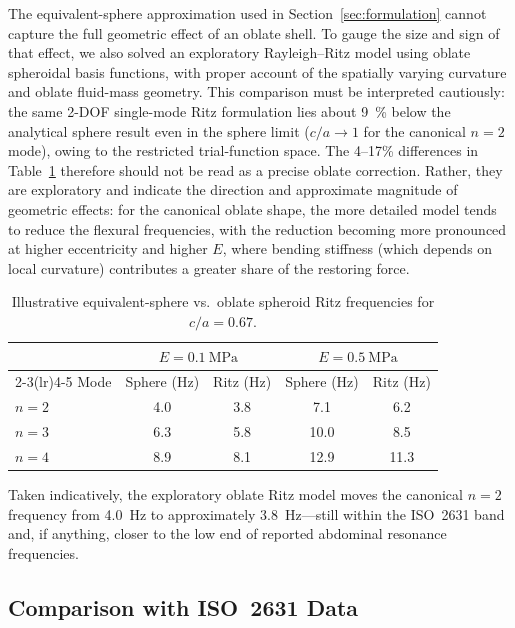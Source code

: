The equivalent-sphere approximation used in Section~\ref{sec:formulation}
cannot capture the full geometric effect of an oblate shell.  To gauge the
size and sign of that effect, we also solved an exploratory Rayleigh--Ritz
model using oblate spheroidal basis functions, with proper account of the
spatially varying curvature and oblate fluid-mass geometry.  This comparison
must be interpreted cautiously: the same 2-DOF single-mode Ritz formulation
lies about \SI{9}{\percent} below the analytical sphere result even in the
sphere limit ($c/a \to 1$ for the canonical $n=2$ mode), owing to the
restricted trial-function space.  The 4--17\% differences in
Table~\ref{tab:oblate_correction} therefore should not be read as a precise
oblate correction.  Rather, they are exploratory and indicate the direction
and approximate magnitude of geometric effects: for the canonical oblate
shape, the more detailed model tends to reduce the flexural frequencies, with
the reduction becoming more pronounced at higher eccentricity and higher $E$,
where bending stiffness (which depends on local curvature) contributes a
greater share of the restoring force.

\begin{table}[htbp]
  \centering
  \caption{Illustrative equivalent-sphere vs.\ oblate spheroid Ritz frequencies for $c/a = 0.67$.}
  \label{tab:oblate_correction}
  \begin{tabular}{lcccc}
    \toprule
    & \multicolumn{2}{c}{$E = \SI{0.1}{\mega\pascal}$}
    & \multicolumn{2}{c}{$E = \SI{0.5}{\mega\pascal}$} \\
    \cmidrule(lr){2-3}\cmidrule(lr){4-5}
    Mode & Sphere (Hz) & Ritz (Hz) & Sphere (Hz) & Ritz (Hz) \\
    \midrule
    $n=2$ & 4.0 & 3.8 & 7.1 & 6.2 \\
    $n=3$ & 6.3 & 5.8 & 10.0 & 8.5 \\
    $n=4$ & 8.9 & 8.1 & 12.9 & 11.3 \\
    \bottomrule
  \end{tabular}
\end{table}

Taken indicatively, the exploratory oblate Ritz model moves the canonical
$n=2$ frequency from \SI{4.0}{\hertz} to approximately \SI{3.8}{\hertz}---still
within the ISO~2631 band and, if anything, closer to the low end of reported
abdominal resonance frequencies.

\subsection{Comparison with ISO~2631 Data}

